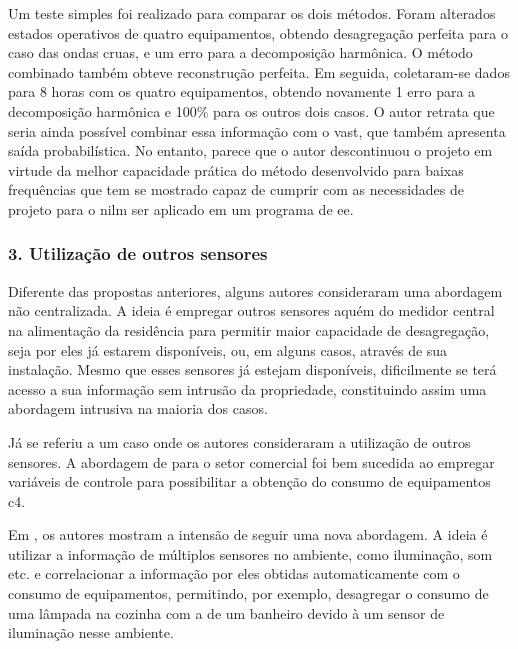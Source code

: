 \begin{enumerate}[label=\textbf{2.\arabic*},wide=\parindent]
Um teste simples foi realizado para comparar os dois métodos. Foram
alterados estados operativos de quatro equipamentos, obtendo desagregação
perfeita para o caso das ondas cruas, e um erro para a decomposição
harmônica. O método combinado também obteve reconstrução perfeita.
Em seguida, coletaram-se dados para 8 horas com os quatro equipamentos,
obtendo novamente 1 erro para a decomposição harmônica e 100\% para os
outros dois casos. O autor retrata que seria ainda possível combinar
essa informação com o \gls{vast}, que também apresenta saída
probabilística. No entanto, parece que o autor descontinuou o projeto
em virtude da melhor capacidade prática do método desenvolvido para
baixas frequências que tem se mostrado capaz de cumprir com as
necessidades de projeto para o \gls{nilm} ser aplicado em um programa
de \gls{ee}.

\end{enumerate}

\subsubsection{3. Utilização de outros sensores}
\label{top:seminilm}

Diferente das propostas anteriores, alguns autores consideraram uma
abordagem não centralizada. A ideia é empregar outros sensores aquém
do medidor central na alimentação da residência para permitir maior
capacidade de desagregação, seja por eles já estarem disponíveis, ou,
em alguns casos, através de sua instalação. Mesmo que esses sensores
já estejam disponíveis, dificilmente se terá acesso a sua informação
sem intrusão da propriedade, constituindo assim uma abordagem
intrusiva na maioria dos casos.

Já se referiu a um caso onde os autores consideraram a utilização de
outros sensores. A abordagem de
\cite{nilm_norford_leeb_medianfilt_1996_13} para o setor comercial foi
bem sucedida ao empregar variáveis de controle para possibilitar a
obtenção do consumo de equipamentos \gls{c4}. 

Em \cite{seminilm_berges_multisensor_2010}, os autores mostram a
intensão de seguir uma nova abordagem. A ideia é utilizar a informação
de múltiplos sensores no ambiente, como iluminação, som etc. e
correlacionar a informação por eles obtidas automaticamente com o
consumo de equipamentos, permitindo, por exemplo, desagregar o consumo de
uma lâmpada na cozinha com a de um banheiro devido à um sensor de
iluminação nesse ambiente.

